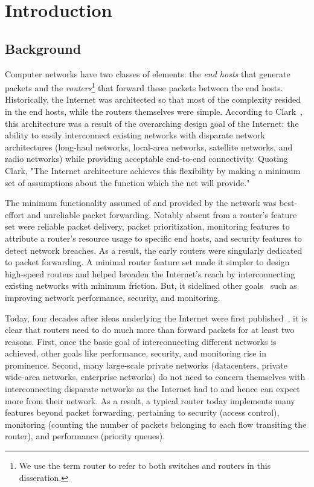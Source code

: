 \chapter{Introduction}
\label{chap:intro}

\section{Background}


Computer networks have two classes of elements: the \textit{end hosts} that
generate packets and the \textit{routers}\footnote{We use the term router to
refer to both switches and routers in this disseration.} that forward these
packets between the end hosts. Historically, the Internet was architected so
that most of the complexity resided in the end hosts, while the routers
themselves were simple. According to Clark~\cite{design_philosophy}, this
architecture was a result of the overarching design goal of the Internet: the
ability to easily interconnect existing networks with disparate network
architectures (\eg long-haul networks, local-area networks, satellite networks,
and radio networks) while providing acceptable end-to-end connectivity. Quoting
Clark, "The Internet architecture achieves this flexibility by making a minimum
set of assumptions about the function which the net will provide."

The minimum functionality assumed of and provided by the network was
best-effort and unreliable packet forwarding. Notably absent from a router's
feature set were reliable packet delivery, packet prioritization, monitoring
features to attribute a router's resource usage to specific end hosts, and
security features to detect network breaches. As a result, the early routers
were singularly dedicated to packet forwarding. A minimal router feature set
made it simpler to design high-speed routers and helped broaden the Internet's
reach by interconnecting existing networks with minimum friction. But, it
sidelined other goals~\cite{design_philosophy} such as improving network
performance, security, and monitoring.
 
Today, four decades after ideas underlying the Internet were first
published~\cite{cerf74}, it is clear that routers need to do much more than
forward packets for at least two reasons. First, once the basic goal of
interconnecting different networks is achieved, other goals like performance,
security, and monitoring rise in prominence.  Second, many large-scale private
networks (\eg datacenters, private wide-area networks, enterprise networks) do
not need to concern themselves with interconnecting disparate networks as the
Internet had to and hence can expect more from their network. As a result, a
typical router today implements many features beyond packet forwarding,
pertaining to security (\eg access control), monitoring (\eg counting the
number of packets belonging to each flow transiting the router), and
performance (\eg priority queues).

